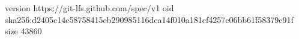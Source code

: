 version https://git-lfs.github.com/spec/v1
oid sha256:d2405c14c58758415eb290985116dca14f010a181cf4257c06bb61f58379c91f
size 43860
